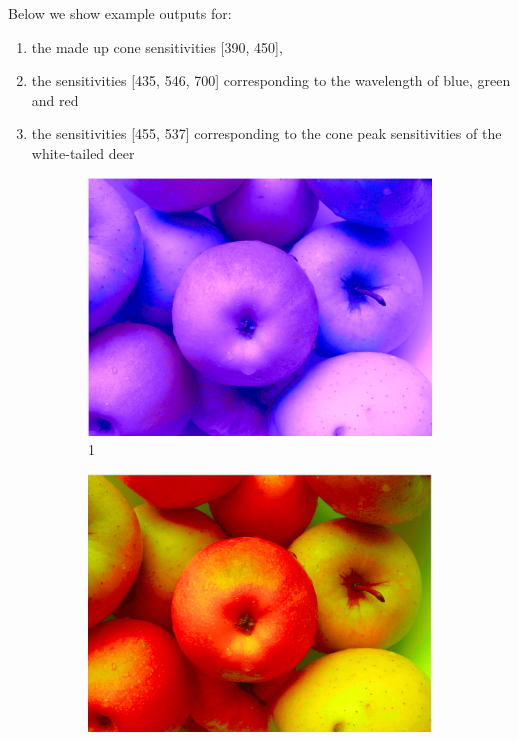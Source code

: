 \documentclass[12pt]{article}
\begin{document}
Below we show example outputs for:

\begin{enumerate}
\item the made up cone sensitivities [390, 450],
\item the sensitivities [435, 546, 700] corresponding to the wavelength of blue, green and red
\item the sensitivities [455, 537] corresponding to the cone peak sensitivities of the white-tailed deer
\end{enumerate}

\begin{figure}[h]
\begin{subfigure}{.33\textwidth}
	\centering
	\includegraphics[width=.9\linewidth]{AnimalVision/1.png}
	\caption*{1}
\end{subfigure}%
\begin{subfigure}{.33\textwidth}
	\centering
	\includegraphics[width=.9\linewidth]{AnimalVision/2.png}

\end{subfigure}
\end{figure}
\end{document}
